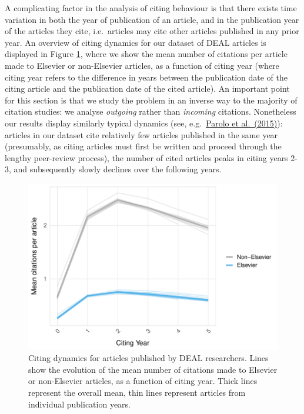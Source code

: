 \documentclass[
]{article}
\begin{document}
A complicating factor in the analysis of citing behaviour is that there exists time variation in both the year of publication of an article, and in the publication year of the articles they cite, i.e.~articles may cite other articles published in any prior year. An overview of citing dynamics for our dataset of DEAL articles is displayed in Figure \ref{fig:references-publisher-year-cityear}, where we show the mean number of citations per article made to Elsevier or non-Elsevier articles, as a function of citing year (where citing year refers to the difference in years between the publication date of the citing article and the publication date of the cited article). An important point for this section is that we study the problem in an inverse way to the majority of citation studies: we analyse \emph{outgoing} rather than \emph{incoming} citations. Nonetheless our results display similarly typical dynamics (see, e.g.~\href{https://doi.org/10.1016/j.joi.2015.07.006}{Parolo et al.~(2015)}): articles in our dataset cite relatively few articles published in the same year (presumably, as citing articles must first be written and proceed through the lengthy peer-review process), the number of cited articles peaks in citing years 2-3, and subsequently slowly declines over the following years.

\begin{figure}

{\centering \includegraphics[width=0.5\linewidth]{analysis_files/figure-latex/references-publisher-year-cityear-1} 

}

\caption{Citing dynamics for articles published by DEAL researchers. Lines show the evolution of the mean number of citations made to Elsevier or non-Elsevier articles, as a function of citing year. Thick lines represent the overall mean, thin lines represent articles from individual publication years.}\label{fig:references-publisher-year-cityear}
\end{figure}
\end{document}
